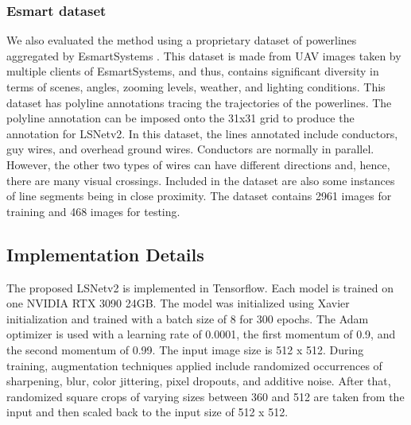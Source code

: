 \documentclass[journal]{IEEEtran}
\begin{document}
\subsubsection{Esmart dataset}
We also evaluated the method using a proprietary dataset of powerlines aggregated by EsmartSystems \cite{esmart_website}. This dataset is made from UAV images taken by multiple clients of EsmartSystems, and thus, contains significant diversity in terms of scenes, angles, zooming levels, weather, and lighting conditions. This dataset has polyline annotations tracing the trajectories of the powerlines. The polyline annotation can be imposed onto the 31x31 grid to produce the annotation for LSNetv2.
In this dataset, the lines annotated include conductors, guy wires, and overhead ground wires. Conductors are normally in parallel. However, the other two types of wires can have different directions and, hence, there are many visual crossings. Included in the dataset are also some instances of line segments being in close proximity. The dataset contains 2961 images for training and 468 images for testing.


\subsection{Implementation Details}

The proposed LSNetv2 is implemented in Tensorflow. Each model is trained on one NVIDIA RTX 3090 24GB. The model was initialized using Xavier initialization \cite{xavier} and trained with a batch size of 8 for 300 epochs. The Adam optimizer \cite{adam} is used with a learning rate of 0.0001, the first momentum of 0.9, and the second momentum of 0.99. The input image size is 512 x 512. During training, augmentation techniques applied include randomized occurrences of sharpening, blur, color jittering, pixel dropouts, and additive noise. After that, randomized square crops of varying sizes between 360 and 512 are taken from the input and then scaled back to the input size of 512 x 512.
\end{document}
